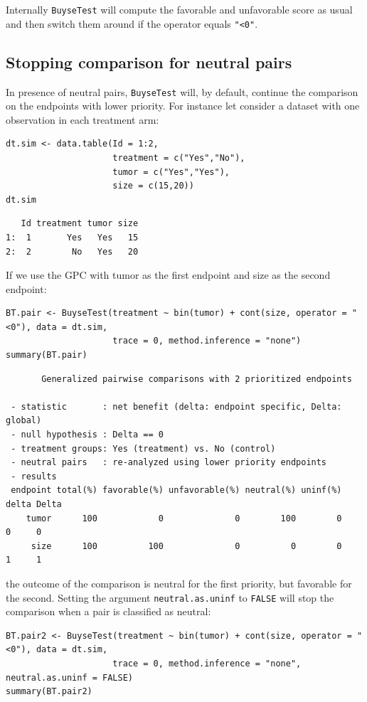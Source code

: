 \documentclass[12pt]{article}
\begin{document}
Internally \texttt{BuyseTest} will compute the favorable and unfavorable
score as usual and then switch them around if the operator equals
\texttt{"<0"}.

\clearpage

\subsection{Stopping comparison for neutral pairs}
\label{sec:orgc1a7142}
In presence of neutral pairs, \texttt{BuyseTest} will, by default, continue
the comparison on the endpoints with lower priority. For instance let
consider a dataset with one observation in each treatment arm:
\lstset{language=r,label= ,caption= ,captionpos=b,numbers=none}
\begin{lstlisting}
dt.sim <- data.table(Id = 1:2,
                     treatment = c("Yes","No"),
                     tumor = c("Yes","Yes"),
                     size = c(15,20))
dt.sim
\end{lstlisting}

\begin{verbatim}
   Id treatment tumor size
1:  1       Yes   Yes   15
2:  2        No   Yes   20
\end{verbatim}


\bigskip

If we use the GPC with tumor as the first endpoint and size as the
second endpoint:
\lstset{language=r,label= ,caption= ,captionpos=b,numbers=none}
\begin{lstlisting}
BT.pair <- BuyseTest(treatment ~ bin(tumor) + cont(size, operator = "<0"), data = dt.sim,
                     trace = 0, method.inference = "none")
summary(BT.pair)
\end{lstlisting}

\begin{verbatim}
       Generalized pairwise comparisons with 2 prioritized endpoints

 - statistic       : net benefit (delta: endpoint specific, Delta: global) 
 - null hypothesis : Delta == 0 
 - treatment groups: Yes (treatment) vs. No (control) 
 - neutral pairs   : re-analyzed using lower priority endpoints
 - results
 endpoint total(%) favorable(%) unfavorable(%) neutral(%) uninf(%) delta Delta
    tumor      100            0              0        100        0     0     0
     size      100          100              0          0        0     1     1
\end{verbatim}

the outcome of the comparison is neutral for the first priority, but
favorable for the second. Setting the argument \texttt{neutral.as.uninf} to
\texttt{FALSE} will stop the comparison when a pair is classified as neutral:
\lstset{language=r,label= ,caption= ,captionpos=b,numbers=none}
\begin{lstlisting}
BT.pair2 <- BuyseTest(treatment ~ bin(tumor) + cont(size, operator = "<0"), data = dt.sim,
                     trace = 0, method.inference = "none", neutral.as.uninf = FALSE)
summary(BT.pair2)
\end{lstlisting}
\end{document}
